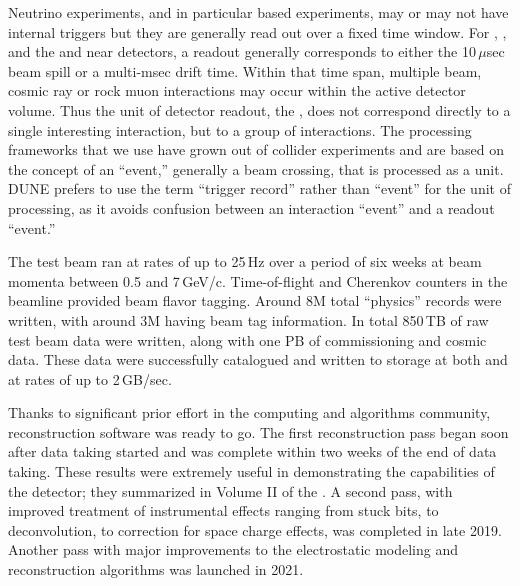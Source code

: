 \documentclass[../main-v1.tex]{subfiles}
\begin{document}

Neutrino experiments, and in particular  based experiments, may or may not have internal triggers but they are generally read out over a fixed time window.  For , ,  and the  and  near detectors, a readout generally corresponds to either the 10\,$\mu$sec beam spill or a multi-msec  drift time.  Within that time span, multiple beam, cosmic ray or rock muon interactions may occur within the active detector volume.  Thus the unit of detector readout, the , does not correspond directly to a single interesting interaction, but to a group of interactions. The processing frameworks that we use have grown out of collider experiments and are based on the concept of an ``event,'' generally a beam crossing, that is processed as a unit.  DUNE prefers to use the term ``trigger record'' rather than ``event'' for the unit of processing, as it avoids confusion between an interaction ``event'' and a readout ``event.''  


The test beam ran at rates of up to 25\,Hz over a period of six weeks at beam momenta between 0.5 and 7\,GeV/c.  Time-of-flight and Cherenkov counters in the beamline provided beam flavor tagging.  Around 8M total ``physics'' records were written, with around 3M having beam tag information.  In total  850\,TB of raw test beam data were written, along with one PB of commissioning and cosmic data. These data were successfully catalogued and written to storage at both  and  at rates of up to 2\,GB/sec.   

Thanks to significant prior effort in the  %
computing and algorithms community, reconstruction software was ready to go. The first reconstruction pass began soon after data taking started and was complete within two weeks of the end of data taking.  These results were extremely useful in demonstrating the capabilities of the detector; they summarized in Volume II of the  \cite{Abi:2020evt}.  A second pass, with improved treatment of instrumental effects ranging from stuck bits, to \twod deconvolution, to correction for space charge effects, was completed in late 2019. Another pass with major improvements to the electrostatic modeling and reconstruction algorithms was launched in 2021. 
\end{document}
